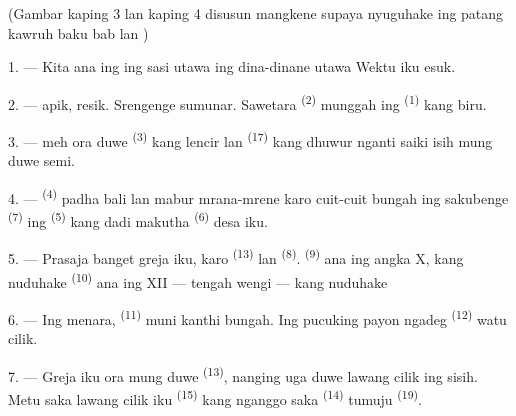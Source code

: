 (Gambar kaping 3 lan kaping 4 disusun mangkene supaya nyuguhake ing
patang  kawruh baku bab 
   lan
)

\VUsaut{4.0mm}
\VUsaut{3.0mm}

\VUsaut{2.4mm}

\VUsaut{3.0mm}

1. --- Kita ana ing  ing sasi 
 utawa  ing dina-dinane 
  utawa  Wektu iku
 esuk.

2. ---  apik,  resik. Srengenge sumunar.
Sawetara  \textsuperscript{(2)} munggah ing
 \textsuperscript{(1)} kang biru.

3. ---  meh ora duwe 
 \textsuperscript{(3)} kang lencir lan  \textsuperscript{(17)} kang dhuwur nganti saiki isih mung duwe
semi.

4. ---  \textsuperscript{(4)} padha bali lan mabur
mrana-mrene karo cuit-cuit bungah ing sakubenge  \textsuperscript{(7)} ing 
\textsuperscript{(5)} kang dadi makutha 
\textsuperscript{(6)} desa iku.

\VUsaut{3.4mm}
\VUsaut{3.0mm}

5. --- Prasaja banget greja iku, karo 
\textsuperscript{(13)} lan  \textsuperscript{(8)}.
 \textsuperscript{(9)} ana ing angka X, kang
nuduhake   \textsuperscript{(10)} ana
ing XII — tengah wengi — kang nuduhake 

6. --- Ing menara,  \textsuperscript{(11)}
muni kanthi bungah. Ing pucuking payon ngadeg 
\textsuperscript{(12)} watu cilik.

7. --- Greja iku ora mung duwe 
\textsuperscript{(13)}, nanging uga duwe lawang cilik ing sisih.
Metu saka lawang cilik iku  \textsuperscript{(15)}
kang nganggo  saka 
\textsuperscript{(14)} tumuju  \textsuperscript{(19)}.

